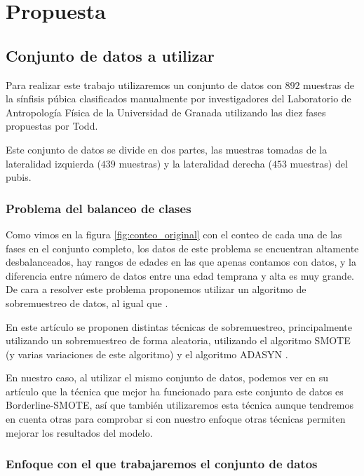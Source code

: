 \section{Propuesta}

\subsection{Conjunto de datos a utilizar}

Para realizar este trabajo utilizaremos un conjunto de datos con $892$ muestras de la sínfisis púbica clasificados manualmente por investigadores del Laboratorio de Antropología Física de la Universidad de Granada utilizando las diez fases propuestas por Todd.

Este conjunto de datos se divide en dos partes, las muestras tomadas de la lateralidad izquierda ($439$ muestras) y la lateralidad derecha ($453$ muestras) del pubis.

\subsubsection{Problema del balanceo de clases}

Como vimos en la figura \ref{fig:conteo_original} con el conteo de cada una de las fases en el conjunto completo, los datos de este problema se encuentran altamente desbalanceados, hay rangos de edades en las que apenas contamos con datos, y la diferencia entre número de datos entre una edad temprana y alta es muy grande. De cara a resolver este problema proponemos utilizar un algoritmo de sobremuestreo de datos, al igual que \cite{NSLVOrdAge}.

En este artículo se proponen distintas técnicas de sobremuestreo, principalmente utilizando un sobremuestreo de forma aleatoria, utilizando el algoritmo SMOTE \cite{revisionSMOTE} (y varias variaciones de este algoritmo) y el algoritmo ADASYN \cite{propuestaADASYN}.

En nuestro caso, al utilizar el mismo conjunto de datos, podemos ver en su artículo que la técnica que mejor ha funcionado para este conjunto de datos es Borderline-SMOTE, así que también utilizaremos esta técnica aunque tendremos en cuenta otras para comprobar si con nuestro enfoque otras técnicas permiten mejorar los resultados del modelo.

\subsubsection{Enfoque con el que trabajaremos el conjunto de datos}


